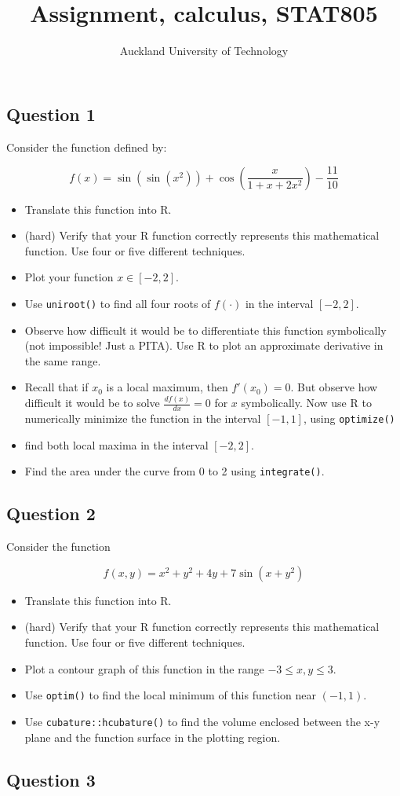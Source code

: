 \documentclass[nojss]{jss}\usepackage[]{graphicx}\usepackage[]{color}
\author{Auckland University of Technology}
\title{Assignment, calculus, STAT805}
\begin{document}
  


\subsection*{Question 1}

Consider the  function defined by:

\[
f(x) = \sin(\sin(x^2)) + \cos\left(\frac{x}{1+x+2x^2}\right)-\frac{11}{10}
\]


\begin{itemize}
\item Translate this function into R.
\item (hard) Verify that your R function correctly represents this
  mathematical function.  Use four or five different techniques.
\item Plot your function
  $x\in\left[-2,2\right]$.
  \item Use {\tt uniroot()} to find all four roots of $f(\cdot)$ in
    the interval $\left[-2,2\right]$.
\item Observe how difficult it would be to differentiate this function
  symbolically (not impossible!  Just a PITA).  Use R to plot an
  approximate derivative in the same range.
\item Recall that if $x_0$ is a local maximum, then
  $f'(x_0)=0$.  But observe how difficult it would be to solve
  $\frac{df(x)}{dx}=0$ for $x$ symbolically.  Now use R to numerically minimize the
  function in the interval $\left[-1,1\right]$, using {\tt optimize()}
  \item find both local maxima in the interval $\left[-2,2\right]$.
\item Find the area under the curve from 0 to 2 using {\tt integrate()}. 
\end{itemize}

\subsection*{Question 2}

Consider the function

\[  
f(x,y) = x^2+y^2+4y+ 7\sin(x+y^2)
\]

\begin{itemize}
\item Translate this function into R.
\item (hard) Verify that your R function correctly represents this mathematical 
  function.  Use four or five different techniques.
\item Plot a contour graph of this function in the range $-3\leq x,y\leq 3$.
\item Use {\tt optim()} to find the local minimum of this function near
$(-1,1)$.
\item Use {\tt cubature::hcubature()} to find the volume enclosed
between the x-y plane and the function surface in the plotting region.
\end{itemize}
    

\subsection*{Question 3}





 
\end{document}
